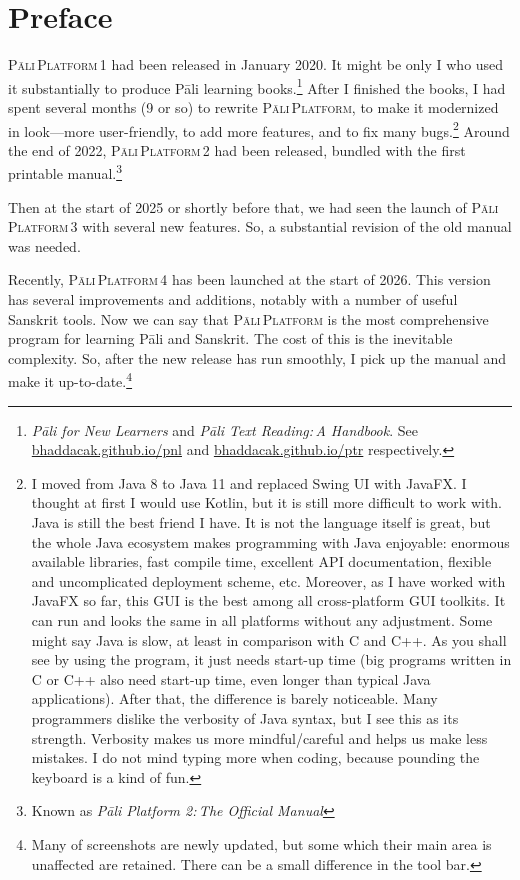 \cleardoublepage
{}
{}
\chapter*{Preface}

\textsc{Pāli\,Platform\,1} had been released in January 2020. It might be only I who used it substantially to produce Pāli learning books.\footnote{\emph{Pāli for New Learners} and \emph{Pāli Text Reading:\,A Handbook}. See \url{bhaddacak.github.io/pnl} and \url{bhaddacak.github.io/ptr} respectively.} After I finished the books, I had spent several months (9 or so) to rewrite \textsc{Pāli\,Platform}, to make it modernized in look---more user-friendly, to add more features, and to fix many bugs.\footnote{I moved from Java 8 to Java 11 and replaced Swing UI with JavaFX. I thought at first I would use Kotlin, but it is still more difficult to work with. Java is still the best friend I have. It is not the language itself is great, but the whole Java ecosystem makes programming with Java enjoyable: enormous available libraries, fast compile time, excellent API documentation, flexible and uncomplicated deployment scheme, etc. Moreover, as I have worked with JavaFX so far, this GUI is the best among all cross-platform GUI toolkits. It can run and looks the same in all platforms without any adjustment. Some might say Java is slow, at least in comparison with C and C++. As you shall see by using the program, it just needs start-up time (big programs written in C or C++ also need start-up time, even longer than typical Java applications). After that, the difference is barely noticeable. Many programmers dislike the verbosity of Java syntax, but I see this as its strength. Verbosity makes us more mindful/careful and helps us make less mistakes. I do not mind typing more when coding, because pounding the keyboard is a kind of fun.} Around the end of 2022, \textsc{Pāli\,Platform\,2} had been released, bundled with the first printable manual.\footnote{Known as \emph{Pāli Platform 2:\,The Official Manual}}

Then at the start of 2025 or shortly before that, we had seen the launch of \textsc{Pāli\,Platform\,3} with several new features. So, a substantial revision of the old manual was needed.

Recently, \textsc{Pāli\,Platform\,4} has been launched at the start of 2026. This version has several improvements and additions, notably with a number of useful Sanskrit tools. Now we can say that \textsc{Pāli\,Platform} is the most comprehensive program for learning Pāli and Sanskrit. The cost of this is the inevitable complexity. So, after the new release has run smoothly, I pick up the manual and make it up-to-date.\footnote{Many of screenshots are newly updated, but some which their main area is unaffected are retained. There can be a small difference in the tool bar.}

